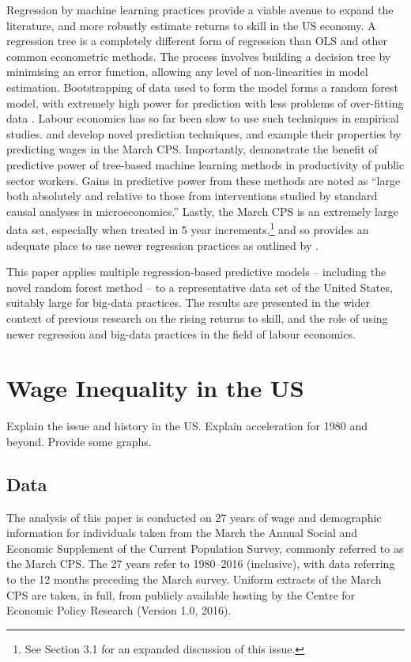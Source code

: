 \documentclass[notitlepage,12pt]{article}
\begin{document}
Regression by machine learning practices provide a viable avenue to expand the literature, and more robustly estimate returns to skill in the US economy.  A regression tree is a completely different form of regression than OLS and other common econometric methods.  The process involves building a decision tree by minimising an error function, allowing any level of non-linearities in model estimation.  Bootstrapping of data used to form the model forms a random forest model, with extremely high power for prediction with less problems of over-fitting data \citep{breiman2001random}.  Labour economics  has so far been slow to use such techniques in empirical studies.  \cite{belloni2011high} and \cite{abadie2017risk} develop novel prediction techniques, and example their properties by predicting wages in the March CPS.  Importantly, \cite{chalfin2016productivity} demonstrate the benefit of predictive power of tree-based machine learning methods in productivity of public sector workers.  Gains in predictive power from these methods are noted as ``large both absolutely and relative to those from interventions studied by standard causal analyses in microeconomics.''  Lastly, the March CPS is an extremely large data set, especially when treated in 5 year increments,\footnote{See Section 3.1 for an expanded discussion of this issue.} and so provides an adequate place to use newer regression practices as outlined by \cite{varian2014big}.

This paper applies multiple regression-based predictive models -- including the novel random forest method -- to a representative data set of the United States, suitably large for big-data practices.  The results are presented in the wider context of previous research on the rising returns to skill, and the role of using newer regression and big-data practices in the field of labour economics.


\section{Wage Inequality in the US}

Explain the issue and history in the US.  Explain acceleration for 1980 and beyond.  Provide some graphs.

\subsection{Data}
The analysis of this paper is conducted on 27 years of wage and demographic information for individuals taken from the March the Annual Social and Economic Supplement of the Current Population Survey, commonly referred to as the March CPS.  The 27 years refer to 1980--2016 (inclusive), with data referring to the 12 months preceding the March survey.  Uniform extracts of the March CPS are taken, in full, from publicly available hosting by the Centre for Economic Policy Research \nocite{center} (Version 1.0, 2016).
\end{document}
